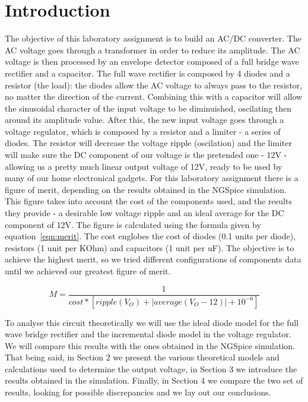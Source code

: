 \section{Introduction}
\label{sec:introduction}
The objective of this laboratory assignment is to build an AC/DC converter. The AC voltage goes through a transformer in order to reduce its amplitude. The AC voltage is then processed by an envelope detector composed of a full bridge wave rectifier and a capacitor. The full wave rectifier is composed by 4 diodes and a resistor (the load): the diodes allow the AC voltage to always pass to the resistor, no matter the direction of the current. Combining this with a capacitor will allow the sinusoidal character of the input voltage to be diminuished, oscilating then around its amplitude value. After this, the new input voltage goes through a voltage regulator, which is composed by a resistor and a limiter - a series of diodes. The resistor will decrease the voltage ripple (oscilation) and the limiter will make sure the DC component of our voltage is the pretended one - 12V - allowing us a pretty much linear output voltage of 12V, ready to be used by many of our home electronical gadgets.
For this laboratory assignment there is a figure of merit, depending on the results obtained in the NGSpice simulation. This figure takes into account the cost of the components used, and the results they provide - a desirable low voltage ripple and an ideal average for the DC component of 12V. The figure is calculated using the formula given by equation~\ref{eqn:merit}. The cost englobes the cost of diodes (0.1 units per diode), resistors (1 unit per KOhm) and capacitors (1 unit per uF). The objective is to achieve the highest merit, so we tried different configurations of components data until we achieved our greatest figure of merit.

\begin{equation}
\label{eqn:merit}
M=\frac{1}{cost*[ripple(V_O) + |average(V_O - 12)| + 10^{-6}]}
\end{equation}

To analyse this circuit theoretically we will use the ideal diode model for the full wave bridge rectifier and the incremental diode model in the voltage regulator. We will compare this results with the ones obtained in the NGSpice simulation.
That being said, in Section 2 we present the various theoretical models and calculations used to determine the output voltage, in Section 3 we introduce the results obtained in the simulation. Finally, in Section 4 we compare the two set of results, looking for possible discrepancies and we lay out our conclusions.

